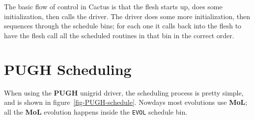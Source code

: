 \documentclass{article}
\def\thorn#1{\textbf{#1}}
\begin{document}
The basic flow of control in Cactus is that the flesh starts up, does
some initialization, then calls the driver.  The driver does some
more initialization, then sequences through the schedule bins; for
each one it calls back into the flesh to have the flesh call all the
scheduled routines in that bin in the correct order.


\section{\thorn{PUGH} Scheduling}

When using the \thorn{PUGH} unigrid driver, the scheduling process
is pretty simple, and is shown in figure~\ref{fig-PUGH-schedule}.
Nowdays most evolutions use \thorn{MoL}; all the \thorn{MoL} evolution
happens inside the \verb|EVOL| schedule bin.
\end{document}
